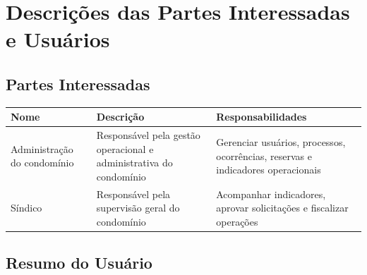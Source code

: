 \section{Descrições das Partes Interessadas e Usuários}

\subsection{Partes Interessadas}

\begin{table}[h]
    \begin{tabular}{| p{} | p{} | p{} |}
        \hline \textbf{Nome} & \textbf{Descrição} & \textbf{Responsabilidades} \\ \hline

            Administração do condomínio &
            Responsável pela gestão operacional e administrativa do condomínio &
            Gerenciar usuários, processos, ocorrências, reservas e indicadores operacionais
            \\ \hline

            Síndico &
            Responsável pela supervisão geral do condomínio &
            Acompanhar indicadores, aprovar solicitações e fiscalizar operações
            \\ \hline

    \end{tabular}
\end{table}

\newpage

\subsection{Resumo do Usuário}

